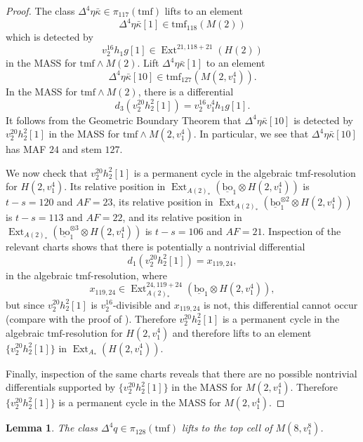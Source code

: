 \documentclass[10pt]{amsart}
\newcommand{\ul}[1]{\underline{#1}}
\newcommand{\tmf}{\mathrm{tmf}}
\newcommand{\bo}{\mathrm{bo}}
\newcommand{\bou}{\ul{\bo}}
\newtheorem{lem}[equation]{Lemma}
\theoremstyle{definition}
\numberwithin{equation}{section}
\numberwithin{figure}{section}
\DeclareMathOperator{\Ext}{Ext}
\begin{document}
\begin{proof}
The class $\Delta^4 \eta \bar{\kappa} \in \pi_{117}(\tmf)$ lifts to an element 
$$\Delta^4 \eta \bar{\kappa}[1] \in \tmf_{118}(M(2))$$ 
which is detected by 
$$v_2^{16} h_1 g[1] \in \Ext^{21, 118+21}(H(2))$$ 
in the MASS for $\tmf \wedge M(2)$. Lift $\Delta^4\eta \bar{\kappa}[1]$ to an element 
$$\Delta^4 \eta \bar{\kappa}[10] \in \tmf_{127}(M(2,v_1^4)).$$ 
In the MASS for $\tmf \wedge M(2)$, there is a differential 
$$d_3(v_2^{20}h_2^2[1]) = v_2^{16} v_1^4 h_1 g[1].$$ 
It follows from the Geometric Boundary Theorem that $\Delta^4 \eta \bar{\kappa}[10]$ is detected by $v_2^{20} h_2^2[1]$ in the MASS for $\tmf \wedge M(2,v_1^4)$. In particular, we see that $\Delta^4 \eta \bar{\kappa}[10]$ has MAF $24$ and stem $127$. 

We now check that $v_2^{20} h_2^2[1]$ is a permanent cycle in the algebraic $\tmf$-resolution for $H(2,v_1^4)$. Its relative position in $\Ext_{A(2)_*}(\bou_1 \otimes H(2,v_1^4))$ is $t-s = 120$ and $AF = 23$, its relative position in $\Ext_{A(2)_*}(\bou_1^{\otimes 2} \otimes H(2,v_1^4))$ is $t-s = 113$ and $AF = 22$, and its relative position in $\Ext_{A(2)_*}(\bou_1^{\otimes 3} \otimes H(2,v_1^4))$ is $t-s = 106$ and $AF = 21$. Inspection of the relevant charts \cite[Figs. 6.4-6.5]{BHHM} shows that there is potentially a nontrivial differential
$$d_1(v_2^{20} h_2^2[1]) = x_{119,24},$$
in the algebraic tmf-resolution, where 
$$ x_{119,24} \in \Ext^{24, 119+24}_{A(2)_*}(\bou_1 \otimes H(2,v_1^4)), $$
but since $v_2^{20} h_2^2[1]$ is $v_2^{16}$-divisible and $x_{119,24}$ is not, this differential cannot occur (compare with the proof of \cite[Prop. 10.1]{BHHM2}). Therefore $v_2^{20} h_2^2[1]$ is a permanent cycle in the algebraic $\tmf$-resolution for $H(2,v_1^4)$ and therefore lifts to an element $\{v_2^{20} h_2^2[1]\}$ in $\Ext_{A_*}(H(2,v_1^4))$. 

Finally, inspection of the same charts reveals that there are no possible nontrivial differentials supported by $\{v_2^{20} h_2^2[1]\}$ in the MASS for $M(2, v_1^4)$. Therefore $\{v_2^{20} h_2^2[1]\}$ is a permanent cycle in the MASS for $M(2,v_1^4)$. 
\end{proof}

\begin{lem}\label{Lem:v216qLift}
The class $\Delta^4 q \in \pi_{128}(\tmf)$  lifts to the top cell of $M(8,v_1^8)$.
\end{lem}
\end{document}
